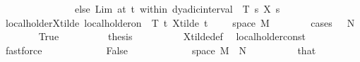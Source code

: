 \begin{isabellebody}
\ \ \ \ \ \ \ \ \ \ \ \ \ \ \ else\ Lim\ {\isacharparenleft}{\kern0pt}at\ t\ within\ dyadic{\isacharunderscore}{\kern0pt}interval\ {}\ T{\isacharparenright}{\kern0pt}\ {\isacharparenleft}{\kern0pt}{\isasymlambda}s{\isachardot}{\kern0pt}\ X\ s\ {\isasymomega}{\isacharparenright}{\kern0pt}{\isacharparenright}{\kern0pt}{\isacharparenright}{\kern0pt}{\isachardoublequoteclose}\isanewline
\ \ \ \ \isamarkupfalse%
\ local{\isacharunderscore}{\kern0pt}holder{\isacharunderscore}{\kern0pt}X{\isacharunderscore}{\kern0pt}tilde{\isacharcolon}{\kern0pt}\ {\isachardoublequoteopen}local{\isacharunderscore}{\kern0pt}holder{\isacharunderscore}{\kern0pt}on\ {\isasymgamma}\ {\isacharbraceleft}{\kern0pt}{}{\isachardot}{\kern0pt}{\isachardot}{\kern0pt}T{\isacharbraceright}{\kern0pt}\ {\isacharparenleft}{\kern0pt}{\isasymlambda}t{\isachardot}{\kern0pt}\ X{\isacharunderscore}{\kern0pt}tilde\ t\ {\isasymomega}{\isacharparenright}{\kern0pt}{\isachardoublequoteclose}\ \ {\isachardoublequoteopen}{\isasymomega}\ {\isasymin}\ space\ {\isacharquery}{\kern0pt}M{\isachardoublequoteclose}\ \ {\isasymomega}\isanewline
\ \ \ \ \isamarkupfalse%
\ {\isacharparenleft}{\kern0pt}cases\ {\isachardoublequoteopen}{\isasymomega}\ {\isasymin}\ {\isacharquery}{\kern0pt}N{\isachardoublequoteclose}{\isacharparenright}{\kern0pt}\isanewline
\ \ \ \ \ \ \isamarkupfalse%
\ True\isanewline
\ \ \ \ \ \ \isamarkupfalse%
\ \isamarkupfalse%
\ {\isacharquery}{\kern0pt}thesis\isanewline
\ \ \ \ \ \ \ \ \isamarkupfalse%
\ X{\isacharunderscore}{\kern0pt}tilde{\isacharunderscore}{\kern0pt}def\ \isamarkupfalse%
\ local{\isacharunderscore}{\kern0pt}holder{\isacharunderscore}{\kern0pt}const\ {\isacartoucheopen}{}\ {\isacharless}{\kern0pt}\ {\isasymgamma}{\isacartoucheclose}\ {\isacartoucheopen}{\isasymgamma}\ {\isacharless}{\kern0pt}\ {}{\isacartoucheclose}\ \isamarkupfalse%
\ fastforce\isanewline
\ \ \ \ \isamarkupfalse%
\isanewline
\ \ \ \ \ \ \isamarkupfalse%
\ False\isanewline
\ \ \ \ \ \ \isamarkupfalse%
\ \isamarkupfalse%
\ {}{\isacharcolon}{\kern0pt}\ {\isachardoublequoteopen}{\isasymomega}\ {\isasymin}\ space\ {\isacharquery}{\kern0pt}M\ {\isacharminus}{\kern0pt}\ {\isacharquery}{\kern0pt}N{\isachardoublequoteclose}\isanewline
\ \ \ \ \ \ \ \ \isamarkupfalse%
\ that\ \isamarkupfalse%

\end{isabellebody}
